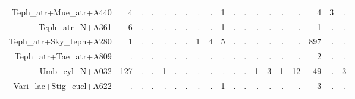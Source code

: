 \documentclass[a4paper, 11]{article}\usepackage[]{graphicx}\usepackage[]{color}
\begin{document}
\begin{table}
\begin{tabular}{rrrrrrrrrrrrrrrrrrr}
  Teph\_atr+Mue\_atr+A440 & 4 & . & . & . & . & . & . & . & 1 & . & . & . & . & . & . & 4 & 3 & . \\ 
  Teph\_atr+N+A361 & 6 & . & . & . & . & . & . & . & 1 & . & . & . & . & . & . & 1 & . & . \\ 
  Teph\_atr+Sky\_teph+A280 & 1 & . & . & . & . & . & 1 & 4 & 5 & . & . & . & . & . & . & 897 & . & . \\ 
  Teph\_atr+Tae\_atr+A809 & . & . & . & . & . & . & . & . & . & . & . & . & . & . & . & 2 & . & . \\ 
  Umb\_cyl+N+A032 & 127 & . & . & 1 & . & . & . & . & . & . & . & 1 & 3 & 1 & 12 & 49 & . & 3 \\ 
  Vari\_lac+Stig\_eucl+A622 & . & . & . & . & . & . & . & . & 1 & . & . & . & . & . & . & 3 & . & . \\ 
   \hline
\end{tabular}
\end{table}
\end{document}
